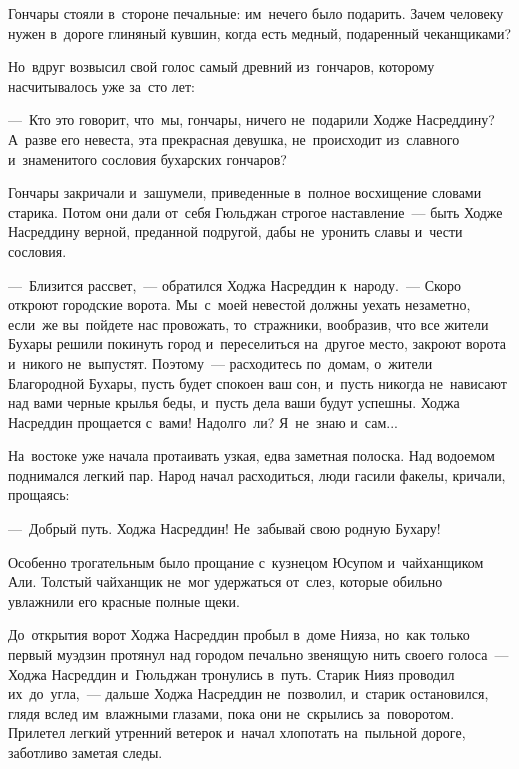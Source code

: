 \documentclass[12pt,a4paper]{book}
\begin{document}
Гончары стояли в~стороне печальные: им~нечего было подарить. Зачем человеку нужен в~дороге глиняный кувшин, когда есть медный, подаренный чеканщиками?

Но~вдруг возвысил свой голос самый древний из~гончаров, которому насчитывалось уже за~сто лет:

—~Кто это говорит, что~мы, гончары, ничего не~подарили Ходже Насреддину? А~разве его невеста, эта прекрасная девушка, не~происходит из~славного и~знаменитого сословия бухарских гончаров?

Гончары закричали и~зашумели, приведенные в~полное восхищение словами старика. Потом они дали от~себя Гюльджан строгое наставление~— быть Ходже Насреддину верной, преданной подругой, дабы не~уронить славы и~чести сословия.

—~Близится рассвет,~— обратился Ходжа Насреддин к~народу.~— Скоро откроют городские ворота. Мы~с~моей невестой должны уехать незаметно, если~же вы~пойдете нас провожать, то~стражники, вообразив, что все жители Бухары решили покинуть город и~переселиться на~другое место, закроют ворота и~никого не~выпустят. Поэтому~— расходитесь по~домам, о~жители Благородной Бухары, пусть будет спокоен ваш сон, и~пусть никогда не~нависают над вами черные крылья беды, и~пусть дела ваши будут успешны. Ходжа Насреддин прощается с~вами! Надолго~ли? Я~не~знаю и~сам...

На~востоке уже начала протаивать узкая, едва заметная полоска. Над водоемом поднимался легкий пар. Народ начал расходиться, люди гасили факелы, кричали, прощаясь:

—~Добрый путь. Ходжа Насреддин! Не~забывай свою родную Бухару!

Особенно трогательным было прощание с~кузнецом Юсупом и~чайханщиком Али. Толстый чайханщик не~мог удержаться от~слез, которые обильно увлажнили его красные полные щеки.

До~открытия ворот Ходжа Насреддин пробыл в~доме Нияза, но~как только первый муэдзин протянул над городом печально звенящую нить своего голоса~— Ходжа Насреддин и~Гюльджан тронулись в~путь. Старик Нияз проводил их~до~угла,~— дальше Ходжа Насреддин не~позволил, и~старик остановился, глядя вслед им~влажными глазами, пока они не~скрылись за~поворотом. Прилетел легкий утренний ветерок и~начал хлопотать на~пыльной дороге, заботливо заметая следы.
\end{document}
